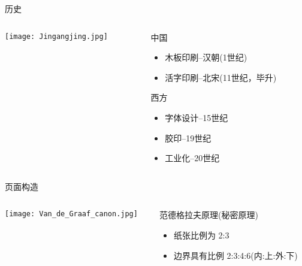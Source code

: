 ﻿\documentclass[hyperref={bookmarks=true},xcolor=pdflatex,svgnames,table,compress]{beamer}
\begin{document}
\begin{frame}{历史}

  \begin{columns}[c]

    \begin{column}{0.4\textwidth}

      \texttt{[image: Jingangjing.jpg]}

    \end{column}

    \begin{column}{0.6\textwidth}
      \begin{block}

        中国
        \begin{itemize}
        \item 木板印刷--汉朝(1世纪)
        \item 活字印刷--北宋(11世纪，毕升)
        \end{itemize}
      \end{block}

      \begin{block}

        西方
        \begin{itemize}
        \item 字体设计--15世纪
        \item 胶印--19世纪
        \item 工业化--20世纪
        \end{itemize}
      \end{block}
    \end{column}

  \end{columns}
\end{frame}

\begin{frame}{页面构造}
  \begin{columns}[c]

    \begin{column}{0.4\textwidth}

      \texttt{[image: Van\_de\_Graaf\_canon.jpg]}

    \end{column}

    \begin{column}{0.6\textwidth}
      \begin{block}

        范德格拉夫原理(秘密原理)
        \begin{itemize}
        \item 纸张比例为 2:3 
        \item 边界具有比例 2:3:4:6(内:上:外:下)
        \end{itemize}
      \end{block}

    \end{column}

  \end{columns}

\end{frame}
\end{document}
